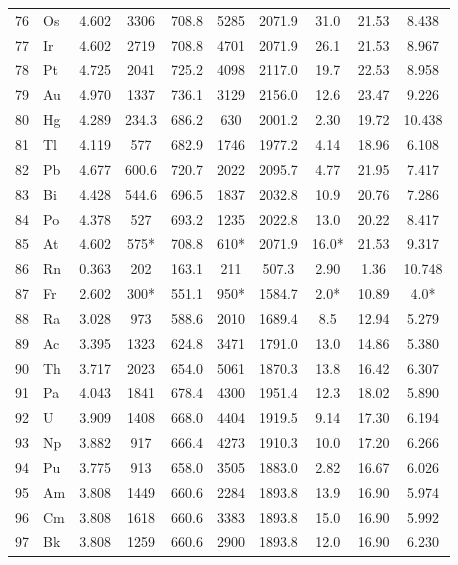 \documentclass[11pt,a4paper]{article}
\begin{document}
\begin{longtable}{@{}llcccccccc@{}}
		76 & Os  & 4.602 & 3306   & 708.8  & 5285   & 2071.9 & 31.0  & 21.53 & 8.438 \\
		77 & Ir  & 4.602 & 2719   & 708.8  & 4701   & 2071.9 & 26.1  & 21.53 & 8.967 \\
		78 & Pt  & 4.725 & 2041   & 725.2  & 4098   & 2117.0 & 19.7  & 22.53 & 8.958 \\
		79 & Au  & 4.970 & 1337   & 736.1  & 3129   & 2156.0 & 12.6  & 23.47 & 9.226 \\
		80 & Hg  & 4.289 & 234.3  & 686.2  & 630    & 2001.2 & 2.30  & 19.72 & 10.438 \\
		81 & Tl  & 4.119 & 577    & 682.9  & 1746   & 1977.2 & 4.14  & 18.96 & 6.108 \\
		82 & Pb  & 4.677 & 600.6  & 720.7  & 2022   & 2095.7 & 4.77  & 21.95 & 7.417 \\
		83 & Bi  & 4.428 & 544.6  & 696.5  & 1837   & 2032.8 & 10.9  & 20.76 & 7.286 \\
		84 & Po  & 4.378 & 527    & 693.2  & 1235   & 2022.8 & 13.0  & 20.22 & 8.417 \\
		85 & At  & 4.602 & 575*   & 708.8  & 610*   & 2071.9 & 16.0* & 21.53 & 9.317 \\
		86 & Rn  & 0.363 & 202    & 163.1  & 211    & 507.3  & 2.90  & 1.36  & 10.748 \\
		87 & Fr  & 2.602 & 300*   & 551.1  & 950*   & 1584.7 & 2.0*  & 10.89 & 4.0* \\
		88 & Ra  & 3.028 & 973    & 588.6  & 2010   & 1689.4 & 8.5   & 12.94 & 5.279 \\
		89 & Ac  & 3.395 & 1323   & 624.8  & 3471   & 1791.0 & 13.0  & 14.86 & 5.380 \\
		90 & Th  & 3.717 & 2023   & 654.0  & 5061   & 1870.3 & 13.8  & 16.42 & 6.307 \\
		91 & Pa  & 4.043 & 1841   & 678.4  & 4300   & 1951.4 & 12.3  & 18.02 & 5.890 \\
		92 & U   & 3.909 & 1408   & 668.0  & 4404   & 1919.5 & 9.14  & 17.30 & 6.194 \\
		93 & Np  & 3.882 & 917    & 666.4  & 4273   & 1910.3 & 10.0  & 17.20 & 6.266 \\
		94 & Pu  & 3.775 & 913    & 658.0  & 3505   & 1883.0 & 2.82  & 16.67 & 6.026 \\
		95 & Am  & 3.808 & 1449   & 660.6  & 2284   & 1893.8 & 13.9  & 16.90 & 5.974 \\
		96 & Cm  & 3.808 & 1618   & 660.6  & 3383   & 1893.8 & 15.0  & 16.90 & 5.992 \\
		97 & Bk  & 3.808 & 1259   & 660.6  & 2900   & 1893.8 & 12.0  & 16.90 & 6.230 \\

\end{longtable}
\end{document}
